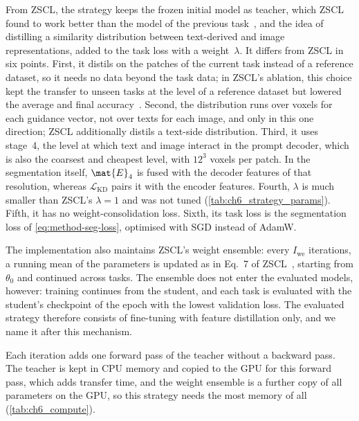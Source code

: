 From ZSCL, the strategy keeps the frozen initial model as teacher, which ZSCL found to work better than the model of the previous task~\cite[Table~1d]{zheng2023preventingzeroshottransferdegradation}, and the idea of distilling a similarity distribution between text-derived and image representations, added to the task loss with a weight~$\lambda$.
It differs from ZSCL in six points.
First, it distils on the patches of the current task instead of a reference dataset, so it needs no data beyond the task data; in ZSCL's ablation, this choice kept the transfer to unseen tasks at the level of a reference dataset but lowered the average and final accuracy~\cite[Table~1b, p.~7]{zheng2023preventingzeroshottransferdegradation}.
Second, the distribution runs over voxels for each guidance vector, not over texts for each image, and only in this one direction; ZSCL additionally distils a text-side distribution.
Third, it uses stage~4, the level at which text and image interact in the prompt decoder, which is also the coarsest and cheapest level, with $12^3$ voxels per patch.
In the segmentation itself, $\mat{E}_4$ is fused with the decoder features of that resolution, whereas $\mathcal{L}_{\mathrm{KD}}$ pairs it with the encoder features.
Fourth, $\lambda$ is much smaller than ZSCL's $\lambda = 1$ and was not tuned (\cref{tab:ch6_strategy_params}).
Fifth, it has no weight-consolidation loss.
Sixth, its task loss is the segmentation loss of \cref{eq:method-seg-loss}, optimised with SGD instead of AdamW.

The implementation also maintains ZSCL's weight ensemble: every $I_{\mathrm{we}}$ iterations, a running mean of the parameters is updated as in Eq.~7 of ZSCL~\cite{zheng2023preventingzeroshottransferdegradation}, starting from $\theta_0$ and continued across tasks.
The ensemble does not enter the evaluated models, however: training continues from the student, and each task is evaluated with the student's checkpoint of the epoch with the lowest validation loss.
The evaluated strategy therefore consists of fine-tuning with feature distillation only, and we name it after this mechanism.

Each iteration adds one forward pass of the teacher without a backward pass.
The teacher is kept in CPU memory and copied to the GPU for this forward pass, which adds transfer time, and the weight ensemble is a further copy of all parameters on the GPU, so this strategy needs the most memory of all (\cref{tab:ch6_compute}).

